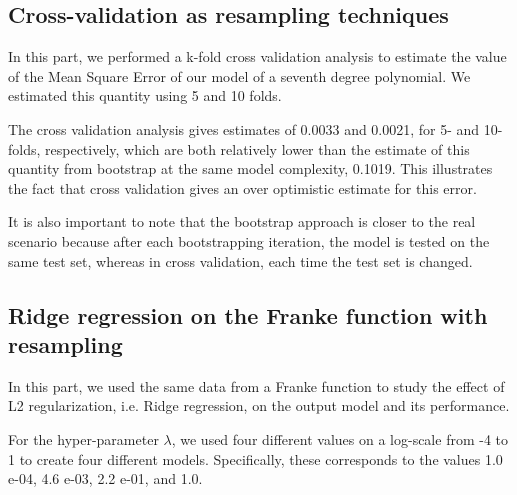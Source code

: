 \documentclass{article}
\begin{document}
\subsection{Cross-validation as resampling techniques}
In this part, we performed a k-fold cross validation analysis to estimate the value of the Mean Square Error of our model of a seventh degree polynomial. We estimated this quantity using 5 and 10 folds.

The cross validation analysis gives estimates of 0.0033 and 0.0021, for 5- and 10-folds, respectively, which are both relatively lower than the estimate of this quantity from bootstrap at the same model complexity, 0.1019. This illustrates the fact that cross validation gives an over optimistic estimate for this error.

It is also important to note that the bootstrap approach is closer to the real scenario because after each bootstrapping iteration, the model is tested on the same test set, whereas in cross validation, each time the test set is changed.

\clearpage
\subsection{Ridge regression on the Franke function with resampling}
In this part, we used the same data from a Franke function to study the effect of L2 regularization, i.e. Ridge regression, on the output model and its performance.

For the hyper-parameter $\lambda$, we used four different values on a log-scale from -4 to 1 to create four different models. Specifically, these corresponds to the values 1.0 e-04, 4.6 e-03, 2.2 e-01, and 1.0.
\end{document}
